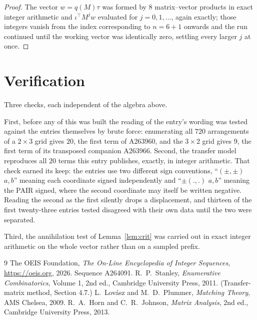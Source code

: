 \documentclass[11pt,a4paper]{article}
\theoremstyle{plain}
\theoremstyle{definition}
\begin{document}
\begin{proof}
The vector $w=q(M)\tau$ was formed by $8$ matrix--vector products in exact integer
arithmetic and $\iota^{\!\top}M^{j}w$ evaluated for $j=0,1,\dots$, again exactly; those
integers vanish from the index corresponding to $n=6+1$ onwards and the run continued
until the working vector was identically zero, settling every larger $j$ at once.
\end{proof}

\section{Verification}

Three checks, each independent of the algebra above.

First, before any of this was built the reading of the entry's wording was tested against the
entries themselves by brute force: enumerating all $720$ arrangements of a $2\times3$ grid
gives $20$, the first term of A263960, and the $3\times2$ grid gives $9$, the first term of its
transposed companion A263966. Second, the transfer model reproduces all $20$ terms this
entry publishes, exactly, in integer arithmetic. That check earned its keep: the entries use
two different sign conventions, ``$(\pm,\pm)$ $a,b$'' meaning each coordinate signed
independently and ``$\pm(.,.)$ $a,b$'' meaning the PAIR signed, where the second coordinate may
itself be written negative. Reading the second as the first silently drops a displacement, and
thirteen of the first twenty-three entries tested disagreed with their own data until the two
were separated.

Third, the annihilation test of Lemma~\ref{lem:crit} was carried out in exact integer
arithmetic on the whole vector rather than on a sampled prefix.

\begin{thebibliography}{9}
 The OEIS Foundation, \emph{The On-Line Encyclopedia of Integer
Sequences}, \url{https://oeis.org}, 2026. Sequence A264091.
 R.~P.~Stanley, \emph{Enumerative Combinatorics}, Volume 1, 2nd ed.,
Cambridge University Press, 2011. (Transfer-matrix method, Section 4.7.)
 L.~Lov\'asz and M.~D.~Plummer, \emph{Matching Theory}, AMS Chelsea, 2009.
 R.~A.~Horn and C.~R.~Johnson, \emph{Matrix Analysis}, 2nd ed., Cambridge
University Press, 2013.
\end{thebibliography}
\end{document}
